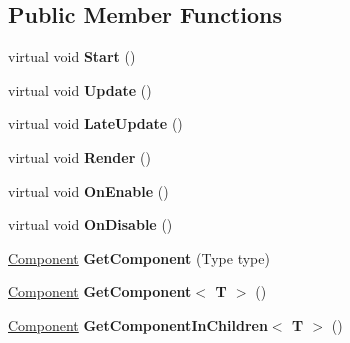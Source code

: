 \subsection*{Public Member Functions}
\begin{DoxyCompactItemize}
\item 
\mbox{\label{class_ecs_1_1_component_ad19efc33f8968ba433aef4df8d4e5488}} 
virtual void {\bfseries Start} ()
\item 
\mbox{\label{class_ecs_1_1_component_ac921cd8d6108a93deabb1b01d21899df}} 
virtual void {\bfseries Update} ()
\item 
\mbox{\label{class_ecs_1_1_component_a44e8b62ae33a573ba0a00b44528599ad}} 
virtual void {\bfseries Late\+Update} ()
\item 
\mbox{\label{class_ecs_1_1_component_ab11b3633f26ba2a465a02cec6d71cb9e}} 
virtual void {\bfseries Render} ()
\item 
\mbox{\label{class_ecs_1_1_component_a6408efbaf664274ce4d33e7484627180}} 
virtual void {\bfseries On\+Enable} ()
\item 
\mbox{\label{class_ecs_1_1_component_a1583b54e365b28288ecc86684650ec2d}} 
virtual void {\bfseries On\+Disable} ()
\item 
\mbox{\label{class_ecs_1_1_component_a5a8a74654c295f63cb943948638cd392}} 
\mbox{\hyperlink{class_ecs_1_1_component}{Component}} {\bfseries Get\+Component} (Type type)
\item 
\mbox{\label{class_ecs_1_1_component_a5f86d9053da960b2e8c2784af7b1660e}} 
\mbox{\hyperlink{class_ecs_1_1_component}{Component}} {\bfseries Get\+Component$<$ T $>$} ()
\item 
\mbox{\label{class_ecs_1_1_component_a8854b7791f9dc6d8d9ec95e79c10355a}} 
\mbox{\hyperlink{class_ecs_1_1_component}{Component}} {\bfseries Get\+Component\+In\+Children$<$ T $>$} ()
\item 
\mbox{\label{class_ecs_1_1_component_a20ea1d6cf3fb9ed8726b041d1ca20a29}} 

\end{DoxyCompactItemize}
